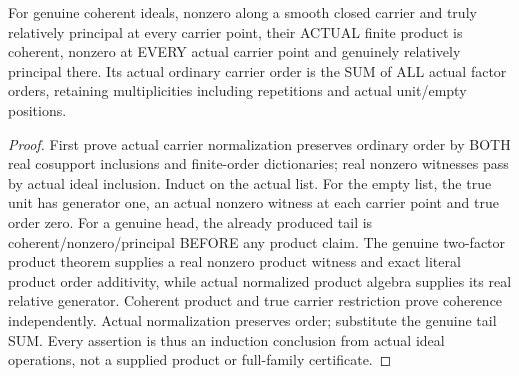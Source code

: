 \begin{theorem}
\label{hir:sharp-actual-finite-relative-product-geometry-order-sum}
\leanok
For genuine coherent ideals, nonzero along a smooth closed carrier and
truly relatively principal at every carrier point, their ACTUAL finite
product is coherent, nonzero at EVERY actual carrier point and genuinely
relatively principal there. Its actual ordinary carrier order is the SUM
of ALL actual factor orders, retaining multiplicities including repetitions
and actual unit/empty positions.
\end{theorem}
\begin{proof}
First prove actual carrier normalization preserves ordinary order by BOTH
real cosupport inclusions and finite-order dictionaries; real nonzero
witnesses pass by actual ideal inclusion. Induct on the actual list. For
the empty list, the true unit has generator one, an actual nonzero witness
at each carrier point and true order zero. For a genuine head, the already
produced tail is coherent/nonzero/principal BEFORE any product claim.
The genuine two-factor product theorem supplies a real nonzero product
witness and exact literal product order additivity, while actual normalized
product algebra supplies its real relative generator. Coherent product and
true carrier restriction prove coherence independently. Actual normalization
preserves order; substitute the genuine tail SUM. Every assertion is thus
an induction conclusion from actual ideal operations, not a supplied product
or full-family certificate.
\end{proof}

